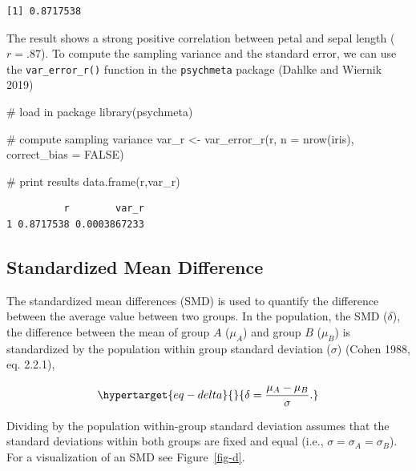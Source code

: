 \documentclass[
  letterpaper,
  DIV=11,
  numbers=noendperiod]{scrreprt}
\newenvironment{Shaded}{}{}
\newcommand{\AttributeTok}[1]{\textcolor[rgb]{0.00,0.34,0.68}{#1}}
\newcommand{\CommentTok}[1]{\textcolor[rgb]{0.54,0.53,0.53}{#1}}
\newcommand{\ConstantTok}[1]{\textcolor[rgb]{0.67,0.33,0.00}{#1}}
\newcommand{\FunctionTok}[1]{\textcolor[rgb]{0.39,0.29,0.61}{#1}}
\newcommand{\NormalTok}[1]{\textcolor[rgb]{0.12,0.11,0.11}{#1}}
\newcommand{\OtherTok}[1]{\textcolor[rgb]{0.00,0.43,0.16}{#1}}
\begin{document}
\begin{tcolorbox}
\begin{verbatim}
[1] 0.8717538
\end{verbatim}

The result shows a strong positive correlation between petal and sepal
length (\(r = .87\)). To compute the sampling variance and the standard
error, we can use the \texttt{var\_error\_r()} function in the
\texttt{psychmeta} package (Dahlke and Wiernik 2019)

\begin{Shaded}
\begin{Highlighting}[]
\CommentTok{\# load in package}
\FunctionTok{library}\NormalTok{(psychmeta)}

\CommentTok{\# compute sampling variance}
\NormalTok{var\_r }\OtherTok{\textless{}{-}} \FunctionTok{var\_error\_r}\NormalTok{(r, }\AttributeTok{n =} \FunctionTok{nrow}\NormalTok{(iris), }\AttributeTok{correct\_bias =} \ConstantTok{FALSE}\NormalTok{)}

\CommentTok{\# print results}
\FunctionTok{data.frame}\NormalTok{(r,var\_r) }
\end{Highlighting}
\end{Shaded}

\begin{verbatim}
          r        var_r
1 0.8717538 0.0003867233
\end{verbatim}

\end{tcolorbox}

\hypertarget{standardized-mean-difference}{%
\subsection{Standardized Mean
Difference}\label{standardized-mean-difference}}

The standardized mean differences (SMD) is used to quantify the
difference between the average value between two groups. In the
population, the SMD (\(\delta\)), the difference between the mean of
group \(A\) (\(\mu_A\)) and group \(B\) (\(\mu_B\)) is standardized by
the population within group standard deviation (\(\sigma\)) (Cohen 1988,
eq. 2.2.1),

\begin{equation}\protect\hypertarget{eq-delta}{}{
\delta = \frac{\mu_A - \mu_B}{\sigma}.
}\label{eq-delta}\end{equation}

Dividing by the population within-group standard deviation assumes that
the standard deviations within both groups are fixed and equal (i.e.,
\(\sigma=\sigma_A=\sigma_B\)). For a visualization of an SMD see
Figure~\ref{fig-d}.
\end{document}
